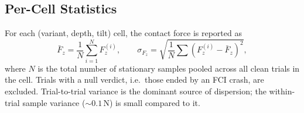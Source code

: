 \subsection{Per-Cell Statistics}

For each (variant, depth, tilt) cell, the contact force is reported as
\begin{equation}
  \bar{F}_z = \frac{1}{N}\sum_{i=1}^{N} F_z^{(i)}, \qquad
  \sigma_{F_z} = \sqrt{\frac{1}{N}\sum (F_z^{(i)} - \bar{F}_z)^2},
\end{equation}
where $N$ is the total number of stationary samples pooled across all
clean trials in the cell. Trials with a null verdict, i.e.\ those ended
by an FCI crash, are excluded. Trial-to-trial variance is the dominant source of dispersion;
the within-trial sample variance ($\sim 0.1$\,N) is small compared to it.
